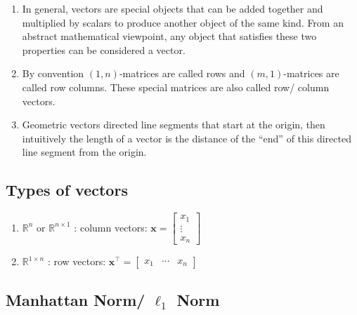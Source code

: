 \begin{enumerate}
    \item In general, vectors are special objects that can be added together and multiplied by scalars to produce another object of the same kind. From an abstract mathematical viewpoint, any object that satisfies these two properties can be considered a vector. 
    \hfill \cite{mfml/book/mml/Deisenroth-Faisal-Ong}

    \item By convention $(1, n)$-matrices are called rows and $(m, 1)$-matrices are called row columns. 
    These special matrices are also called row/ column vectors.
    \hfill \cite{mfml/book/mml/Deisenroth-Faisal-Ong}

    \item Geometric vectors directed line segments that start at the origin, then intuitively the length of a vector is the distance of the “end” of this directed line segment from the origin.
    \hfill \cite{mfml/book/mml/Deisenroth-Faisal-Ong}
\end{enumerate}




\subsection{Types of vectors}

\begin{enumerate}
    \item $\mathbb{R}^n$ or $\mathbb{R}^{n\times 1}$ : column vectors: 
    $
        \bm{x} = 
        \begin{bmatrix}
            x_1\\ \vdots \\ x_n
        \end{bmatrix}
    $
    \hfill \cite{mfml/book/mml/Deisenroth-Faisal-Ong}

    \item $\mathbb{R}^{1\times n}$ : row vectors: 
    $
        \bm{x}^\top = \begin{bmatrix}x_1 & \cdots & x_n\end{bmatrix}
    $
    \hfill \cite{mfml/book/mml/Deisenroth-Faisal-Ong}
\end{enumerate}






\subsection{Manhattan Norm/ $\ell_1$ Norm}

